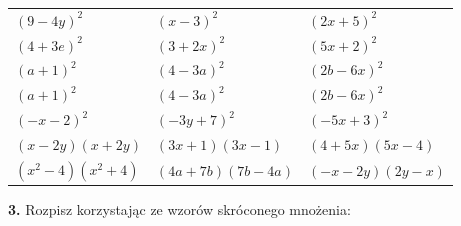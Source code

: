 \documentclass[12pt,a4paper]{article}
\theoremstyle{break}
\begin{document}
	\begin{enumerate}[a)] \begin{tabular}{p{5cm} p{5cm} p{5cm}} 
		\item $(9-4y)^2$ & \vspace{0.25cm}\item$(x-3)^2$ &\vspace{0.25cm}\item $(2x+5)^2$\\
		\item $(4+3e)^2$ & \item $(3+2x)^2$ &\item $(5x+2)^2$\\
		\item $(a+1)^2$ & \item $(4-3a)^2$ &\item $(2b-6x)^2$\\
		\item $(a+1)^2$ & \item $(4-3a)^2$ &\item $(2b-6x)^2$\\
		\item $(-x-2)^2$ & \item $(-3y+7)^2$ &\item $(-5x+3)^2$\\
		\item $(x-2y)(x+2y)$ & \item $(3x+1)(3x-1)$ &\item $(4+5x)(5x-4)$\\
		\item $(x^2-4)(x^2+4)$ & \item $(4a+7b)(7b-4a)$ &\item $(-x-2y)(2y-x)$\\
\end{tabular} \end{enumerate}

			\begin{mdframed}[%
	linecolor=white,%
	innertopmargin=\topskip,
	shadowsize=0,%
	innertopmargin=5,%
	innerbottommargin=5,%
	leftmargin=10,%
	rightmargin=10,%
	backgroundcolor=gray!20,%
	innertopmargin=0pt,]
	\vspace{0.2cm}
	\textbf{3.} Rozpisz korzystając ze wzorów skróconego mnożenia:
\end{mdframed}
\end{document}
